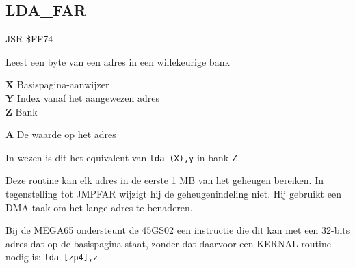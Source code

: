 \subsection{LDA{\_}FAR}
\label{KERNAL Jump Table!LDA_FAR}
\begin{description}[leftmargin=2cm,style=nextline]
    \item [Adres:] JSR \$FF74    \item [Omschrijving:] Leest een byte van een adres in een willekeurige bank    \item [Invoer:]        \textbf{X} Basispagina-aanwijzer \\        \textbf{Y} Index vanaf het aangewezen adres \\        \textbf{Z} Bank    \item [Uitvoer:]        \textbf{A} De waarde op het adres    \item [Opmerkingen:]        In wezen is dit het equivalent van \texttt{lda (X),y} in bank Z.

        Deze routine kan elk adres in de eerste 1 MB van het geheugen bereiken. In tegenstelling tot JMPFAR wijzigt hij de geheugenindeling niet. Hij gebruikt een DMA-taak om het lange adres te benaderen.

        Bij de MEGA65 ondersteunt de 45GS02 een instructie die dit kan met een 32-bits adres dat op de basispagina staat, zonder dat daarvoor een KERNAL-routine nodig is: \texttt{lda [zp4],z}    \item [Voorbeeld:]

\end{description}



\newpage
